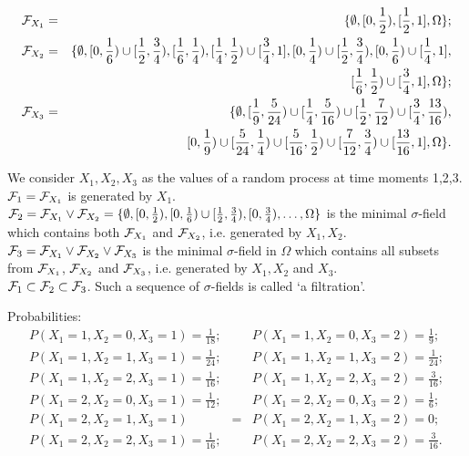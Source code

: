\documentclass[a4paper,10pt]{article}
\newcommand{\1}[1]{\mathbf{1}_{\{#1\}}}
\begin{document}
\begin{eqnarray*}
{\cal F}_{X_1}&=&\{\emptyset, [0,\frac{1}{2}), [\frac{1}{2},1], \Omega\};\\
{\cal F}_{X_2}&=&\{\emptyset, [0,\frac{1}{6})\cup[\frac{1}{2},\frac{3}{4}),[\frac{1}{6},\frac{1}{4}),[\frac{1}{4},\frac{1}{2})\cup[\frac{3}{4},1],[0,\frac{1}{4})\cup [\frac{1}{2},\frac{3}{4}), [0,\frac{1}{6})\cup [\frac{1}{4},1],\\
&& [\frac{1}{6},\frac{1}{2})\cup [\frac{3}{4},1], \Omega\};\\
{\cal F}_{X_3}&=& \{\emptyset,[\frac{1}{9},\frac{5}{24})\cup[\frac{1}{4},\frac{5}{16})\cup[\frac{1}{2},\frac{7}{12})\cup [\frac{3}{4},\frac{13}{16}),\\
&&[0,\frac{1}{9})\cup[\frac{5}{24},\frac{1}{4})\cup[\frac{5}{16},\frac{1}{2})\cup [\frac{7}{12},\frac{3}{4})\cup[\frac{13}{16},1],\Omega\}.
\end{eqnarray*}

We consider $X_1,X_2,X_3$ as the values of a random process at time moments 1,2,3.\\
${\cal F}_1={\cal F}_{X_1}$ is generated by $X_1$.\\
${\cal F}_2={\cal F}_{X_1}\vee{\cal F}_{X_2}=\{\emptyset, [0,\frac{1}{2}), [0,\frac{1}{6})\cup [\frac{1}{2}, \frac{3}{4}), [0,\frac{3}{4}),\ldots, \Omega\}$ is the minimal $\sigma$-field which contains both ${\cal F}_{X_1}$ and ${\cal F}_{X_2}$, i.e. generated by $X_1,X_2$.\\
${\cal F}_3={\cal F}_{X_1}\vee{\cal F}_{X_2}\vee{\cal F}_{X_3}$ is the minimal $\sigma$-field in $\Omega$ which contains all subsets from ${\cal F}_{X_1}$, ${\cal F}_{X_2}$ and ${\cal F}_{X_3}$, i.e. generated by $X_1,X_2$ and $X_3$. \\
${\cal F}_1\subset {\cal F}_2\subset{\cal F}_3$. Such a sequence of $\sigma$-fields is called `a filtration'.\vspace{5mm}

Probabilities:
\begin{eqnarray*}
P(X_1=1,X_2=0,X_3=1)=\frac{1}{18}; && P(X_1=1,X_2=0,X_3=2)=\frac{1}{9};\\
P(X_1=1,X_2=1,X_3=1)=\frac{1}{24}; && P(X_1=1,X_2=1,X_3=2)=\frac{1}{24};\\
P(X_1=1,X_2=2,X_3=1)=\frac{1}{16}; && P(X_1=1,X_2=2,X_3=2)=\frac{3}{16};\\
P(X_1=2,X_2=0,X_3=1)=\frac{1}{12}; && P(X_1=2,X_2=0,X_3=2)=\frac{1}{6};\\
P(X_1=2,X_2=1,X_3=1) &=& P(X_1=2,X_2=1,X_3=2)=0;\\
P(X_1=2,X_2=2,X_3=1)=\frac{1}{16}; && P(X_1=2,X_2=2,X_3=2)=\frac{3}{16}.
\end{eqnarray*}
\end{document}
